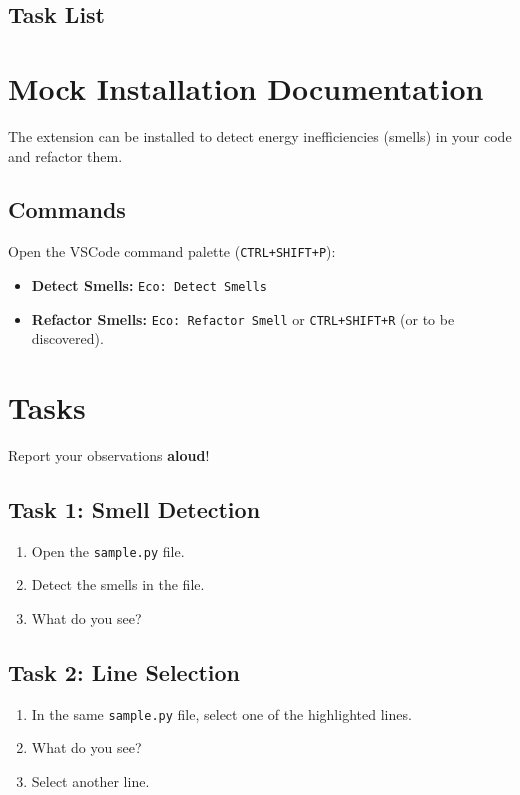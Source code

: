 \documentclass[12pt, titlepage]{article}
\begin{document}
\subsection*{Task List}

\section*{Mock Installation Documentation}
The extension can be installed to detect energy inefficiencies
(smells) in your code and refactor them.

\subsection*{Commands}
Open the VSCode command palette (\texttt{CTRL+SHIFT+P}):

\begin{itemize}
  \item \textbf{Detect Smells:} \texttt{Eco: Detect Smells}
  \item \textbf{Refactor Smells:} \texttt{Eco: Refactor Smell} or
    \texttt{CTRL+SHIFT+R} (or to be discovered).
\end{itemize}

\section*{Tasks}
Report your observations \textbf{aloud}!

\subsection*{Task 1: Smell Detection}
\begin{enumerate}
  \item Open the \texttt{sample.py} file.
  \item Detect the smells in the file.
  \item What do you see?
\end{enumerate}

\subsection*{Task 2: Line Selection}
\begin{enumerate}
  \item In the same \texttt{sample.py} file, select one of the
    highlighted lines.
  \item What do you see?
  \item Select another line.
\end{enumerate}
\end{document}
